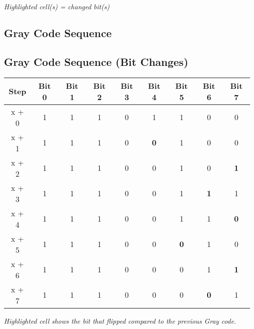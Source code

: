 \emph{Highlighted cell(s) = changed bit(s)}


\bigskip

\subsection*{Gray Code Sequence}
\subsection*{Gray Code Sequence (Bit Changes)}

\begin{tabular}{|c|*8{c|}}
\hline
Step &  Bit 0 &  Bit 1 &  Bit 2 &  Bit 3 &  Bit 4 &  Bit 5 &  Bit 6 &  Bit 7   \\
\hline
x + 0 &
    1
&    1
&    1
&    0
&    1
&    1
&    0
&    0
 \\
\hline
x + 1 &
    1
&    1
&    1
&    0
&    \cellcolor{yellow}\textbf{ 0 }
&    1
&    0
&    0
 \\
\hline
x + 2 &
    1
&    1
&    1
&    0
&    0
&    1
&    0
&    \cellcolor{yellow}\textbf{ 1 }
 \\
\hline
x + 3 &
    1
&    1
&    1
&    0
&    0
&    1
&    \cellcolor{yellow}\textbf{ 1 }
&    1
 \\
\hline
x + 4 &
    1
&    1
&    1
&    0
&    0
&    1
&    1
&    \cellcolor{yellow}\textbf{ 0 }
 \\
\hline
x + 5 &
    1
&    1
&    1
&    0
&    0
&    \cellcolor{yellow}\textbf{ 0 }
&    1
&    0
 \\
\hline
x + 6 &
    1
&    1
&    1
&    0
&    0
&    0
&    1
&    \cellcolor{yellow}\textbf{ 1 }
 \\
\hline
x + 7 &
    1
&    1
&    1
&    0
&    0
&    0
&    \cellcolor{yellow}\textbf{ 0 }
&    1
 \\
\hline
\end{tabular}

\emph{Highlighted cell shows the bit that flipped compared to the previous Gray code.}



\pagebreak